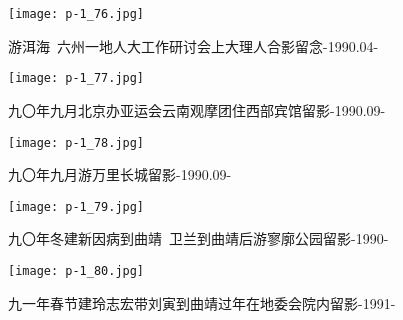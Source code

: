 \clearpage


\begin{figure}
    \begin{center}
        \texttt{[image: p-1\_76.jpg]}
        \begin{shaded}
            \caption{游洱海~六州一地人大工作研讨会上大理人合影留念-1990.04-}
        \end{shaded}
    \end{center}
\end{figure}

\clearpage


\begin{figure}
    \begin{center}
        \texttt{[image: p-1\_77.jpg]}
        \begin{shaded}
            \caption{九〇年九月北京办亚运会云南观摩团住西部宾馆留影-1990.09-}
        \end{shaded}
    \end{center}
\end{figure}

\clearpage


\begin{figure}
    \begin{center}
        \texttt{[image: p-1\_78.jpg]}
        \begin{shaded}
            \caption{九〇年九月游万里长城留影-1990.09-}
        \end{shaded}
    \end{center}
\end{figure}

\clearpage


\begin{figure}
    \begin{center}
        \texttt{[image: p-1\_79.jpg]}
        \begin{shaded}
            \caption{九〇年冬建新因病到曲靖~卫兰到曲靖后游寥廓公园留影-1990-}
        \end{shaded}
    \end{center}
\end{figure}

\clearpage


\begin{figure}
    \begin{center}
        \texttt{[image: p-1\_80.jpg]}
        \begin{shaded}
            \caption{九一年春节建玲志宏带刘寅到曲靖过年在地委会院内留影-1991-}
        \end{shaded}
    \end{center}
\end{figure}


